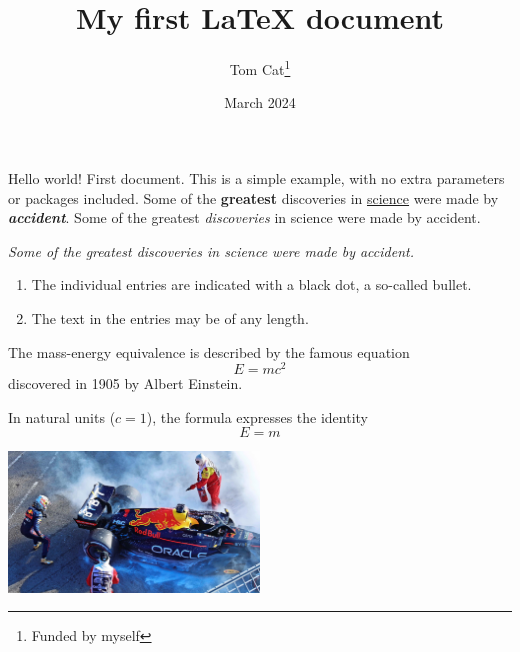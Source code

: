 \documentclass[12pt, letterpaper]{article}
\title{My first LaTeX document}
\author{Tom Cat\thanks{Funded by myself}}
\date{March 2024}
\begin{document}
\maketitle
Hello world!
First document. This is a simple example, with no
extra parameters or packages included.
Some of the \textbf{greatest}
discoveries in \underline{science}
were made by \textbf{\textit{accident}}.
Some of the greatest \emph{discoveries} in science 
were made by accident.

\textit{Some of the greatest \emph{discoveries} 
in science were made by accident.}


\begin{enumerate}
    \item The individual entries are indicated with a black dot, a so-called bullet.
    \item The text in the entries may be of any length.
\end{enumerate}

The mass-energy equivalence is described by the famous equation
\[ E=mc^2 \] discovered in 1905 by Albert Einstein. 

In natural units ($c = 1$), the formula expresses the identity
\begin{equation}
E=m
\end{equation}

\includegraphics[width=0.5\textwidth]{GEEJj_kXYAImdwn}
\end{document}
